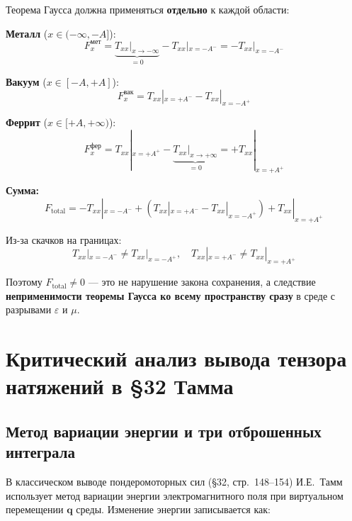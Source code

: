 \documentclass[a4paper,12pt]{article}
\begin{document}
Теорема Гаусса должна применяться \textbf{отдельно} к каждой области:

\textbf{Металл} ($x \in (-\infty, -A]$):
\begin{equation}
F_x^{\text{мет}} = \underbrace{T_{xx}|_{x \to -\infty}}_{=0}
- T_{xx}|_{x=-A^-} = -T_{xx}|_{x=-A^-}
\end{equation}

\textbf{Вакуум} ($x \in [-A, +A]$):
\begin{equation}
F_x^{\text{вак}} = T_{xx}|_{x=+A^-} - T_{xx}|_{x=-A^+}
\end{equation}

\textbf{Феррит} ($x \in [+A, +\infty)$):
\begin{equation}
F_x^{\text{фер}} = T_{xx}|_{x=+A^+}
- \underbrace{T_{xx}|_{x \to +\infty}}_{=0} = +T_{xx}|_{x=+A^+}
\end{equation}

\textbf{Сумма:}
\begin{equation}
F_{\text{total}} = -T_{xx}|_{x=-A^-} + (T_{xx}|_{x=+A^-} - T_{xx}|_{x=-A^+})
+ T_{xx}|_{x=+A^+}
\end{equation}

Из-за скачков на границах:
\begin{equation}
T_{xx}|_{x=-A^-} \neq T_{xx}|_{x=-A^+}, \quad
T_{xx}|_{x=+A^-} \neq T_{xx}|_{x=+A^+}
\end{equation}

Поэтому \textbf{$F_{\text{total}} \neq 0$} --- это не нарушение закона
сохранения, а следствие \textbf{неприменимости теоремы Гаусса ко всему
пространству сразу} в среде с разрывами $\varepsilon$ и $\mu$.




\section{Критический анализ вывода тензора натяжений в §32 Тамма}

\subsection{Метод вариации энергии и три отброшенных интеграла}

В классическом выводе пондеромоторных сил (§32, стр.~148--154) И.Е.~Тамм
использует метод вариации энергии электромагнитного поля при виртуальном
перемещении $\mathbf{q}$ среды. Изменение энергии записывается как:
\end{document}
